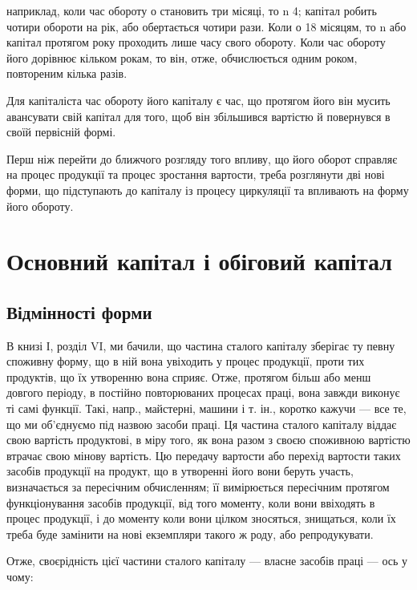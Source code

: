 \parcont{}  %
наприклад, коли час обороту о становить три місяці, то n \deq{}  \deq{} 4; капітал
робить чотири обороти на рік, або обертається чотири рази.
Коли о \deq{} 18 місяцям, то n \deq{}  \deq{}  або капітал протягом року проходить
лише  часу свого обороту. Коли час обороту його дорівнює кільком
рокам, то він, отже, обчислюється одним роком, повтореним кілька
разів.

Для капіталіста час обороту його капіталу є час, що протягом його він
мусить авансувати свій капітал для того, щоб він збільшився вартістю
й повернувся в своїй первісній формі.

Перш ніж перейти до ближчого розгляду того впливу, що його
оборот справляє на процес продукції та процес зростання вартости, треба
розглянути дві нові форми, що підступають до капіталу із процесу циркуляції
та впливають на форму його обороту.

\section{Основний капітал і обіговий капітал}

\subsection{Відмінності форми}

В книзі І, розділ VI, ми бачили, що частина сталого капіталу зберігає
ту певну споживну форму, що в ній вона увіходить у процес
продукції, проти тих продуктів, що їх утворенню вона сприяє. Отже,
протягом більш або менш довгого періоду, в постійно повторюваних
процесах праці, вона завжди виконує ті самі функції. Такі, напр., майстерні,
машини і т. ін., коротко кажучи — все те, що ми об’єднуємо
під назвою засоби праці. Ця частина сталого капіталу віддає свою
вартість продуктові, в міру того, як вона разом з своєю споживною
вартістю втрачає свою мінову вартість. Цю передачу вартости або перехід
вартости таких засобів продукції на продукт, що в утворенні його
вони беруть участь, визначається за пересічним обчисленням; її вимірюється
пересічним протягом функціонування засобів продукції, від
того моменту, коли вони ввіходять в процес продукції, і до моменту
коли вони цілком зносяться, знищаться, коли їх треба буде замінити на
нові екземпляри такого ж роду, або репродукувати.

Отже, своєрідність цієї частини сталого капіталу — власне засобів
праці — ось у чому:

